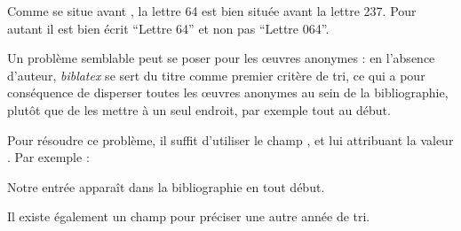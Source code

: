 Comme  se situe avant , la lettre 64 est bien située avant la lettre 237. Pour autant il est bien écrit \enquote{Lettre 64} et non pas \enquote{Lettre 064}.

Un problème semblable peut se poser pour les œuvres anonymes : en l'absence d'auteur, \emph{biblatex} se sert du titre comme premier critère de tri, ce qui a pour conséquence de disperser toutes les œuvres anonymes au sein de la bibliographie, plutôt que de les mettre à un seul endroit, par exemple tout au début.

Pour résoudre ce problème, il suffit d'utiliser le champ , et lui attribuant la valeur .
Par exemple :

\begin{latexcode}
@book{clef,
    Sortname = {0},
    Title = {Œuvre anonyme}
\end{latexcode}

Notre entrée  apparaît dans la bibliographie en tout début.

Il existe également un champ  pour préciser une autre année de tri. 
